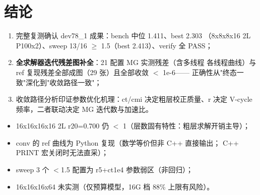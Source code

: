\documentclass[UTF8]{ctexart}
\begin{document}
\section{结论}
\begin{conclbox}
\begin{enumerate}
\item 完整复测确认 dev78\_1 成果：bench 中位 1.411、best 2.303
  （8x8x8x16 2L P100x2）、sweep 13/16 $\ge$ 1.5（best 2.413）、verify 全 PASS；
\item \textbf{全求解器迭代残差图补全}：21 配置 MG 实测残差（含多线程
  各线程曲线）与 ref 复现残差全部成图（29 张）且全部收敛 $<$ 1e-6——
  正确性从"终态一致"深化到"收敛路径一致"；
\item 收敛路径分析印证参数优化机理：ct/cmi 决定粗层校正质量、r 决定
  V-cycle 频率，二者联动决定 MG 迭代数与加速比。
\end{enumerate}
\end{conclbox}

\begin{warnbox}
\begin{itemize}
\item 16x16x16x16 2L r20=0.700 仍 $<$ 1（层数固有特性：粗层求解开销主导）；
\item conv 的 ref 曲线为 Python 复现（数学等价但非 C++ 直接输出；
  C++ PRINT 宏关闭时无法直采）；
\item sweep 3 个 $<$1.5 配置为 r5+ct1e4 参数弱区（非回归）；
\item 16x16x16x64 未实测（仅预算模型，16G 档 88\% 上限有风险）。
\end{itemize}
\end{warnbox}
\end{document}
